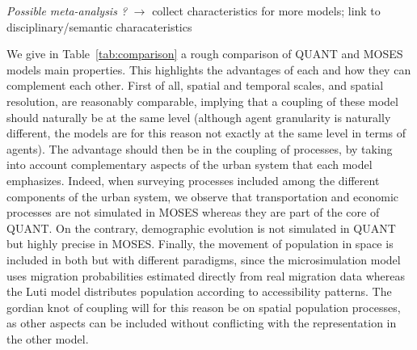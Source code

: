 \textit{Possible meta-analysis ?} $\rightarrow$ collect characteristics for more models; link to disciplinary/semantic characateristics



We give in Table~\ref{tab:comparison} a rough comparison of QUANT and MOSES models main properties. This highlights the advantages of each and how they can complement each other. First of all, spatial and temporal scales, and spatial resolution, are reasonably comparable, implying that a coupling of these model should naturally be at the same level (although agent granularity is naturally different, the models are for this reason not exactly at the same level in terms of agents). The advantage should then be in the coupling of processes, by taking into account complementary aspects of the urban system that each model emphasizes. Indeed, when surveying processes included among the different components of the urban system, we observe that transportation and economic processes are not simulated in MOSES whereas they are part of the core of QUANT. On the contrary, demographic evolution is not simulated in QUANT but highly precise in MOSES. Finally, the movement of population in space is included in both but with different paradigms, since the microsimulation model uses migration probabilities estimated directly from real migration data whereas the Luti model distributes population according to accessibility patterns. The gordian knot of coupling will for this reason be on spatial population processes, as other aspects can be included without conflicting with the representation in the other model.



